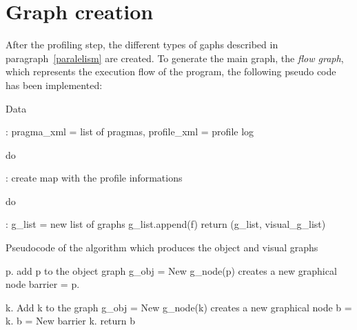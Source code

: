 \documentclass[a4paper,12pt,oneside]{book}
\begin{document}
\section{Graph creation}
\label{graph}

After the profiling step, the different types of gaphs described in paragraph~\ref{paralelism} are created. To generate the main graph, the \emph{flow graph}, which represents the execution flow of the program, the following pseudo code has been implemented:

\begin{algorithm}[H]
\begin{algorithmic}
\State \begin{bf}Data\end{bf}: pragma\_xml = list of pragmas, profile\_xml = profile log
\State \begin{bf}do\end{bf}: create map with the profile informations
\State \begin{bf}do\end{bf}: g\_list = new list of graphs
\State g\_list.append(f)  
\State {} 
\EndFor
\State return (g\_list, visual\_g\_list) 
\EndFunction
\end{algorithmic}
\caption{Pseudocode of the algorithm which produces the object and visual graphs}
\begin{algorithmic}
\State p.
\State add p to the object graph
\State g\_obj = New g\_node(p) \Comment creates a new graphical node
\State barrier = 
\State p.
\EndIf
\EndFor
\EndFunction
\end{algorithmic}

\begin{algorithmic}
\State k.
\State Add k to the graph
\State g\_obj = New g\_node(k) \Comment creates a new graphical node
\State b = 
\State k.
\Else 
\State b = New barrier
\State k.
\EndIf
\EndFor
\State return b
\EndFunction

\end{algorithmic}
\end{algorithm}
\end{document}
